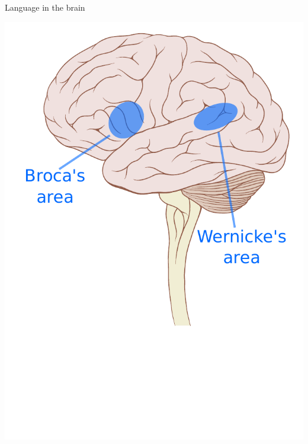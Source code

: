 \documentclass[xcolor=x11names,compress]{beamer}
\renewcommand{\(}{\begin{columns}}
\renewcommand{\)}{\end{columns}}
\newcommand{\<}[1]{\begin{column}{#1}}
\renewcommand{\>}{\end{column}}
\begin{document}
\begin{frame}[t]{Language in the brain}
\begin{center}
{    \includegraphics[height=0.9\textheight]{brain3}
    }
\end{center}
\end{frame}
\end{document}
